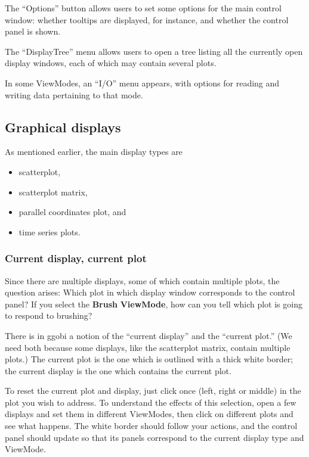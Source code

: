 \documentclass[11pt]{article}
\begin{document}
The ``Options'' button allows users to set some options for the
main control window:  whether tooltips are displayed, for instance,
and whether the control panel is shown.

The ``DisplayTree'' menu allows users to open a tree listing
all the currently open display windows, each of which may contain
several plots.

In some ViewModes, an ``I/O'' menu appears, with options for
reading and writing data pertaining to that mode.

\subsection{Graphical displays}
\label{slbl:GraphicalDisplays}

As mentioned earlier, the main display types are
\begin{itemize}
\itemsep 0em
\item scatterplot,
\item scatterplot matrix,
\item parallel coordinates plot, and
\item time series plots.
\end{itemize}

\subsubsection{Current display, current plot}

Since there are multiple displays, some of which contain multiple
plots, the question arises:  Which plot in which display window
corresponds to the control panel?  If you select the {\bf Brush} {\bf
ViewMode}, how can you tell which plot is going to respond to
brushing?

There is in ggobi a notion of the ``current display'' and the
``current plot.''  (We need both because some displays, like the
scatterplot matrix, contain multiple plots.) The current plot is the
one which is outlined with a thick white border; the current display
is the one which contains the current plot.

To reset the current plot and display, just click once (left, right
or middle) in the plot you wish to address.  To understand the
effects of this selection, open a few displays and set them in
different ViewModes, then click on different plots and see what
happens.  The white border should follow your actions, and the
control panel should update so that its panels correspond to the
current display type and ViewMode.
\end{document}
